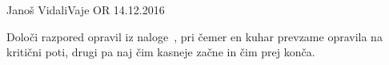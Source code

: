 \begin{naloga}{Janoš Vidali}{Vaje OR 14.12.2016}
\begin{vprasanje}
Določi razpored opravil iz naloge~\nal[palacinke],
pri čemer en kuhar prevzame opravila na kritični poti,
drugi pa naj čim kasneje začne in čim prej konča.
\end{vprasanje}
\begin{odgovor}
\end{odgovor}
\end{naloga}
